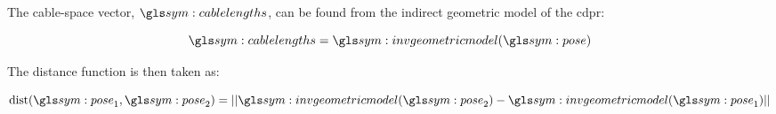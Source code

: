 		The cable-space vector, $\cablelengths$, can be found from the indirect
		geometric model of the \gls{cdpr}:

		\begin{equation}
			\cablelengths = \invgeometricmodel(\pose)
		\end{equation}

		The distance function is then taken as:

		\begin{equation}
			\dist(\pose_1, \pose_2) =
				\norm{%
					\invgeometricmodel(\pose_2) - \invgeometricmodel(\pose_1)
				}
		\end{equation}

